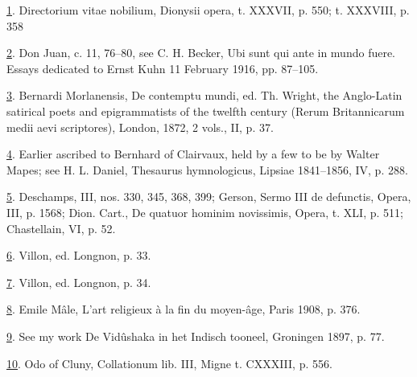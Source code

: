 \protect\hypertarget{23_NOTES.xhtmlux5cux23id_1350}{\protect\hyperlink{12_Chapter_Five__THE_VISION_OF_DEAT.xhtmlux5cux23id_1349}{1}}.
Directorium vitae nobilium, Dionysii opera, t. XXXVII, p. 550; t.
XXXVIII, p. 358

\protect\hypertarget{23_NOTES.xhtmlux5cux23id_1348}{\protect\hyperlink{12_Chapter_Five__THE_VISION_OF_DEAT.xhtmlux5cux23id_1347}{2}}.
Don Juan, c. 11, 76--80, see C. H. Becker, Ubi sunt qui ante in mundo
fuere. Essays dedicated to Ernst Kuhn 11 February 1916, pp. 87--105.

\protect\hypertarget{23_NOTES.xhtmlux5cux23id_1346}{\protect\hyperlink{12_Chapter_Five__THE_VISION_OF_DEAT.xhtmlux5cux23id_1345}{3}}.
Bernardi Morlanensis, De contemptu mundi, ed. Th. Wright, the
Anglo-Latin satirical poets and epigrammatists of the twelfth century
(Rerum Britannicarum medii aevi scriptores), London, 1872, 2 vols., II,
p. 37.

\protect\hypertarget{23_NOTES.xhtmlux5cux23id_1344}{\protect\hyperlink{12_Chapter_Five__THE_VISION_OF_DEAT.xhtmlux5cux23id_1343}{4}}.
Earlier ascribed to Bernhard of Clairvaux, held by a few to be by Walter
Mapes; see H. L. Daniel, Thesaurus hymnologicus, Lipsiae 1841--1856, IV,
p. 288.

\protect\hypertarget{23_NOTES.xhtmlux5cux23id_1342}{\protect\hyperlink{12_Chapter_Five__THE_VISION_OF_DEAT.xhtmlux5cux23id_1341}{5}}.
Deschamps, III, nos. 330, 345, 368, 399; Gerson, Sermo III de defunctis,
Opera, III, p. 1568; Dion. Cart., De quatuor hominim novissimis, Opera,
t. XLI, p. 511; Chastellain, VI, p. 52.

\protect\hypertarget{23_NOTES.xhtmlux5cux23id_1340}{\protect\hyperlink{12_Chapter_Five__THE_VISION_OF_DEAT.xhtmlux5cux23id_1339}{6}}.
Villon, ed. Longnon, p. 33.

\protect\hypertarget{23_NOTES.xhtmlux5cux23id_1338}{\protect\hyperlink{12_Chapter_Five__THE_VISION_OF_DEAT.xhtmlux5cux23id_1337}{7}}.
Villon, ed. Longnon, p. 34.

\protect\hypertarget{23_NOTES.xhtmlux5cux23id_1336}{\protect\hyperlink{12_Chapter_Five__THE_VISION_OF_DEAT.xhtmlux5cux23id_1335}{8}}.
Emile Mâle, L'art religieux à la fin du moyen-âge, Paris 1908, p. 376.

\protect\hypertarget{23_NOTES.xhtmlux5cux23id_1334}{\protect\hyperlink{12_Chapter_Five__THE_VISION_OF_DEAT.xhtmlux5cux23id_1333}{9}}.
See my work De Vidûshaka in het Indisch tooneel, Groningen 1897, p. 77.

\protect\hypertarget{23_NOTES.xhtmlux5cux23id_1332}{\protect\hyperlink{12_Chapter_Five__THE_VISION_OF_DEAT.xhtmlux5cux23id_1331}{10}}.
Odo of Cluny, Collationum lib. III, Migne t. CXXXIII, p. 556.

